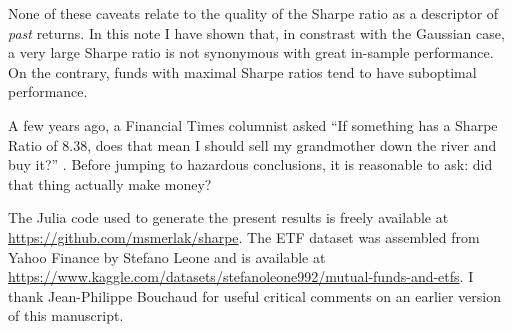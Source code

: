 \documentclass[
reprint,
amsmath,amssymb,
aps,
]{revtex4-2}
\begin{document}
None of these caveats relate to the quality of the Sharpe ratio as a descriptor of \emph{past} returns. 
In this note I have shown that, in constrast with the Gaussian case, a very large Sharpe ratio is not synonymous with great in-sample performance. 
On the contrary, funds with maximal Sharpe ratios tend to have suboptimal performance. 

A few years ago, a Financial Times columnist asked ``If something has a Sharpe Ratio of 8.38, does that mean I should sell my grandmother down the river and buy it?'' \cite{shubberIf2016}. 
Before jumping to hazardous conclusions, it is reasonable to ask: did that thing actually make money? 

\medskip

The Julia code used to generate the present results is freely available at \url{https://github.com/msmerlak/sharpe}. The ETF dataset was assembled from Yahoo Finance by Stefano Leone and is available at \url{https://www.kaggle.com/datasets/stefanoleone992/mutual-funds-and-etfs}. I thank Jean-Philippe Bouchaud for useful critical comments on an earlier version of this manuscript. 


\end{document}
